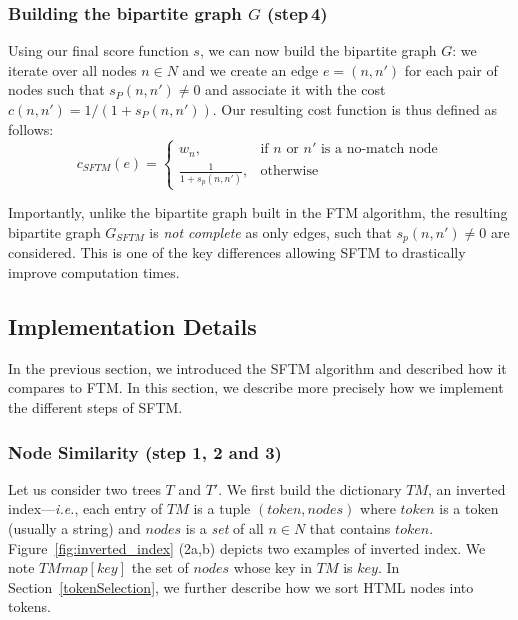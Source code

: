 \subsubsection{Building the bipartite graph $G$ (step\,4)}
Using our final score function $s$, we can now build the bipartite graph $G$: we iterate over all nodes $n \in N$ and we create an edge $e=(n,n')$ for each pair of nodes such that $s_{P}(n,n') \neq 0$ and associate it with the cost $c(n,n') = 1/(1+s_{P}(n,n'))$.
Our resulting cost function is thus defined as follows:
\begin{equation}\label{eq:SFTM_cost}
c_{SFTM}(e) =
\begin{cases}
w_n,                    & \text{if }n\text{ or }n'\text{ is a no-match node}\\
\frac{1}{1+s_{p}(n,n')},& \text{otherwise}
\end{cases}
\end{equation}

Importantly, unlike the bipartite graph built in the FTM algorithm, the resulting bipartite graph $G_{SFTM}$ is \emph{not complete} as only edges, such that $s_{p}(n,n') \neq 0$ are considered.
This is one of the key differences allowing SFTM to drastically improve computation times.

\subsection{Implementation Details}\label{sec:implementation}
In the previous section, we introduced the SFTM algorithm and described how it compares to FTM.
In this section, we describe more precisely how we implement the different steps of SFTM.  

\subsubsection{Node Similarity (step 1, 2 and 3)}
Let us consider two trees $T$ and $T'$.
We first build the dictionary $TM$, an inverted index---\emph{i.e.}, each entry of $TM$ is a tuple $(token, nodes)$ where $token$ is a token (usually a string) and $nodes$ is a \textit{set} of all $n \in N$ that contains $token$.
Figure~\ref{fig:inverted_index} (2a,b) depicts two examples of inverted index.
We note $TM{map}[key]$ the set of $nodes$ whose key in $TM$ is $key$.
In Section~\ref{tokenSelection}, we further describe how we sort HTML nodes into tokens.

